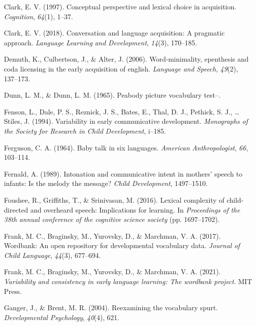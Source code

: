 \documentclass[10pt, letterpaper]{article}
\newenvironment{CSLReferences}%
  {}%
  {\par}
\begin{document}
\begin{CSLReferences}{1}{0}
\leavevmode\hypertarget{ref-clark1997conceptual}{}%
Clark, E. V. (1997). Conceptual perspective and lexical choice in
acquisition. \emph{Cognition}, \emph{64}(1), 1--37.

\leavevmode\hypertarget{ref-clark2018conversation}{}%
Clark, E. V. (2018). Conversation and language acquisition: A pragmatic
approach. \emph{Language Learning and Development}, \emph{14}(3),
170--185.

\leavevmode\hypertarget{ref-demuth2006word}{}%
Demuth, K., Culbertson, J., \& Alter, J. (2006). Word-minimality,
epenthesis and coda licensing in the early acquisition of english.
\emph{Language and Speech}, \emph{49}(2), 137--173.

\leavevmode\hypertarget{ref-dunn1965peabody}{}%
Dunn, L. M., \& Dunn, L. M. (1965). Peabody picture vocabulary test--.

\leavevmode\hypertarget{ref-fenson1994variability}{}%
Fenson, L., Dale, P. S., Reznick, J. S., Bates, E., Thal, D. J.,
Pethick, S. J., \ldots{} Stiles, J. (1994). Variability in early
communicative development. \emph{Monographs of the Society for Research
in Child Development}, i--185.

\leavevmode\hypertarget{ref-ferguson1964baby}{}%
Ferguson, C. A. (1964). Baby talk in six languages. \emph{American
Anthropologist}, \emph{66}, 103--114.

\leavevmode\hypertarget{ref-fernald1989intonation}{}%
Fernald, A. (1989). Intonation and communicative intent in mothers'
speech to infants: Is the melody the message? \emph{Child Development},
1497--1510.

\leavevmode\hypertarget{ref-foushee2016lexical}{}%
Foushee, R., Griffiths, T., \& Srinivasan, M. (2016). Lexical complexity
of child-directed and overheard speech: Implications for learning. In
\emph{Proceedings of the 38th annual conference of the cognitive science
society} (pp. 1697--1702).

\leavevmode\hypertarget{ref-frank2017wordbank}{}%
Frank, M. C., Braginsky, M., Yurovsky, D., \& Marchman, V. A. (2017).
Wordbank: An open repository for developmental vocabulary data.
\emph{Journal of Child Language}, \emph{44}(3), 677--694.

\leavevmode\hypertarget{ref-frank2021variability}{}%
Frank, M. C., Braginsky, M., Yurovsky, D., \& Marchman, V. A. (2021).
\emph{Variability and consistency in early language learning: The
wordbank project}. MIT Press.

\leavevmode\hypertarget{ref-ganger2004reexamining}{}%
Ganger, J., \& Brent, M. R. (2004). Reexamining the vocabulary spurt.
\emph{Developmental Psychology}, \emph{40}(4), 621.


\end{CSLReferences}
\end{document}
